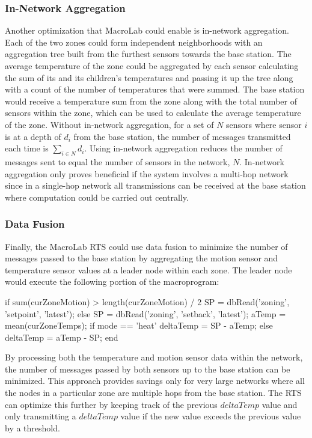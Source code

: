 \subsubsection{In-Network Aggregation}
Another optimization that MacroLab could enable is in-network aggregation. Each
of the two zones could form independent neighborhoods with an aggregation tree
built from the furthest sensors towards the base station. The average
temperature of the zone could be aggregated by each sensor calculating the sum
of its and its children's temperatures and passing it up the tree along with a
count of the number of temperatures that were summed. The base station would
receive a temperature sum from the zone along with the total number of sensors
within the zone, which can be used to calculate the average temperature of the
zone. Without in-network aggregation, for a set of $N$ sensors where sensor $i$
is at a depth of $d_i$ from the base station, the number of messages transmitted
each time is $\displaystyle\sum\limits_{i \in N} d_i$. Using in-network
aggregation reduces the number of messages sent to equal the number of sensors
in the network, $N$. In-network aggregation only proves beneficial if the system
involves a multi-hop network since in a single-hop network all transmissions can
be received at the base station where computation could be carried out centrally.

\subsubsection{Data Fusion}
Finally, the MacroLab RTS could use data fusion to minimize the number of
messages passed to the base station by aggregating the motion sensor and
temperature sensor values at a leader node within each zone. The leader node
would execute the following portion of the macroprogram:

\begin{macrolab}
if sum(curZoneMotion) > length(curZoneMotion) / 2
  SP = dbRead('zoning', 'setpoint', 'latest');
else
  SP = dbRead('zoning', 'setback', 'latest');
aTemp = mean(curZoneTemps);
if mode == 'heat'
  deltaTemp = SP - aTemp;
else
  deltaTemp = aTemp - SP;
end
\end{macrolab}

By processing both the temperature and motion sensor data within the network,
the number of messages passed by both sensors up to the base station can be
minimized. This approach provides savings only for very large networks where all
the nodes in a particular zone are multiple hops from the base station. The RTS
can optimize this further by keeping track of the previous $deltaTemp$ value and
only transmitting a $deltaTemp$ value if the new value exceeds the previous
value by a threshold.

